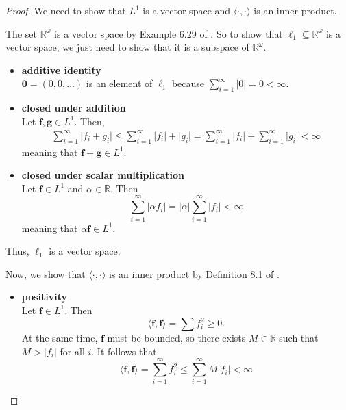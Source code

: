 \begin{proof}
    We need to show that $L^1$ is a vector space and $\langle \cdot, \cdot \rangle$ is an inner product.

    The set $\mathbb{R}^{\omega}$ is a vector space by Example 6.29 of \cite{axler2020}.
    So to show that $\ell_1 \subseteq \mathbb{R}^{\omega}$ is a vector space, we just need to show that it is a subspace of $\mathbb{R}^{\omega}$.
    \begin{itemize}
        \item \textbf{additive identity}\\
            $\mathbf{0} = (0, 0, \ldots)$ is an element of $\ell_1$ because
            $\sum\limits_{i=1}^{\infty} \lvert 0 \rvert = 0 < \infty$.
        \item \textbf{closed under addition} \\
            Let $\mathbf{f}, \mathbf{g} \in L^1$.
            Then,
            \begin{align*}
                \sum\limits_{i=1}^{\infty} \lvert f_i + g_i \rvert
                \leq \sum\limits_{i=1}^{\infty} \lvert f_i \rvert + \lvert g_i \rvert
                = \sum\limits_{i=1}^{\infty} \lvert f_i \rvert + \sum\limits_{i=1}^{\infty} \lvert g_i \rvert
                < \infty
            \end{align*}
            meaning that $\mathbf{f} + \mathbf{g} \in L^1$.
        \item \textbf{closed under scalar multiplication} \\
            Let $\mathbf{f} \in L^1$ and $\alpha \in \mathbb{R}$.
            Then
            \begin{equation*}
                \sum\limits_{i=1}^{\infty} \lvert \alpha f_i \rvert
                = \lvert \alpha \rvert \sum\limits_{i=1}^{\infty} \lvert f_i \rvert
                < \infty
            \end{equation*}
            meaning that $\alpha \mathbf{f} \in L^1$.
    \end{itemize}
    Thus, $\ell_1$ is a vector space.

    Now, we show that $\langle \cdot , \cdot \rangle$ is an inner product by Definition 8.1 of \cite{axler2020}.
    \begin{itemize}
        \item \textbf{positivity}\\
            Let $\mathbf{f} \in L^1$.
            Then
            \begin{equation*}
                \langle \mathbf{f}, \mathbf{f} \rangle
                = \sum f_i^2
                \geq 0.
            \end{equation*}
            At the same time, $\mathbf{f}$ must be bounded, so there exists $M \in \mathbb{R}$ such that $M > \lvert f_i \rvert$ for all $i$.
            It follows that
            \begin{equation*}
                \langle \mathbf{f}, \mathbf{f} \rangle
                = \sum\limits_{i=1}^{\infty} f_i^2
                \leq \sum\limits_{i=1}^{\infty}
                M \lvert f_i \rvert < \infty
            \end{equation*}


\end{itemize}
\end{proof}
